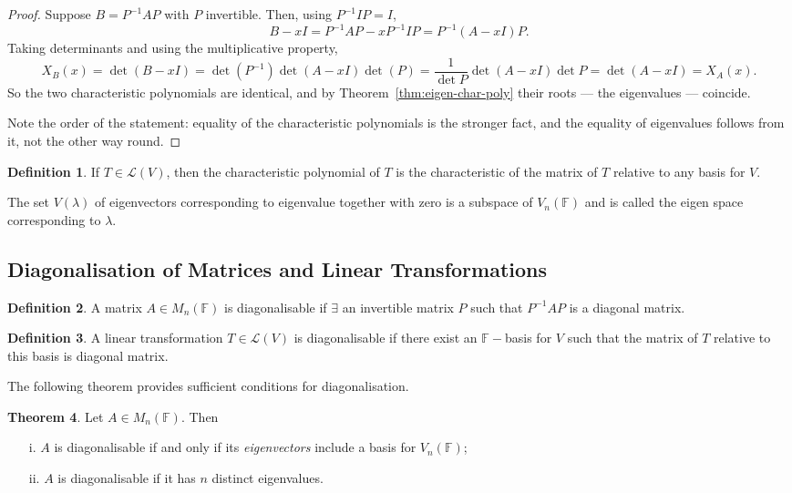 \documentclass[11pt,a4paper]{article}
\theoremstyle{definition}
\newtheorem{thm}{Theorem}[subsection]
\newtheorem{defn}[thm]{Definition}
\begin{document}
\begin{proof}
Suppose $B=P^{-1}AP$ with $P$ invertible. Then, using $P^{-1}IP=I$,
$$B-xI=P^{-1}AP-xP^{-1}IP=P^{-1}(A-xI)P.$$
Taking determinants and using the multiplicative property,
$$X_B(x)=\det(B-xI)=\det(P^{-1})\det(A-xI)\det(P)
=\frac{1}{\det P}\det(A-xI)\det P=\det(A-xI)=X_A(x).$$
So the two characteristic polynomials are identical, and by
Theorem~\ref{thm:eigen-char-poly} their roots --- the eigenvalues --- coincide.

Note the order of the statement: equality of the characteristic polynomials is
the stronger fact, and the equality of eigenvalues follows from it, not the
other way round.
\end{proof}


\begin{defn}
If $T\in \mathcal{L}(V)$, then the characteristic polynomial of $T$ is the characteristic of the matrix of $T$ relative to any basis for $V$.

The set $V(\lambda)$ of eigenvectors corresponding to eigenvalue together with zero is a subspace of $V_n(\mathbb{F})$ and is called the eigen space corresponding to $\lambda$.
\end{defn}


\subsection{Diagonalisation of Matrices and Linear Transformations}

\begin{defn}
A matrix $A\in M_n(\mathbb{F})$ is diagonalisable if $\exists$ an invertible matrix $P$ such that $P^{-1}AP$ is a diagonal matrix.
\end{defn}


\begin{defn}
A linear transformation $T\in \mathcal{L}(V)$ is diagonalisable if there exist an $\mathbb{F}-$basis for $V$ such that the matrix of $T$ relative to this basis is diagonal matrix.


\end{defn}
The following theorem provides sufficient conditions for diagonalisation.


\begin{thm}\label{thm:diagonalisable-criterion}
Let $A\in M_n(\mathbb{F})$. Then
\begin{enumerate}
\item[i.] $A$ is diagonalisable if and only if its \emph{eigenvectors} include a
basis for $V_n(\mathbb{F})$;
\item[ii.] $A$ is diagonalisable if it has $n$ distinct eigenvalues.
\end{enumerate}
\end{thm}
\end{document}
